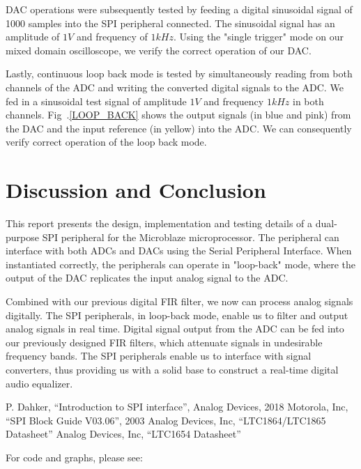 \documentclass[conference]{IEEEtran}
\begin{document}
DAC operations were subsequently tested by feeding a digital sinusoidal signal of 1000 samples into the SPI peripheral connected. The sinusoidal signal has an amplitude of $1V$ and frequency of $1kHz$. Using the "single trigger" mode on our mixed domain oscilloscope, we verify the correct operation of our DAC.

Lastly, continuous loop back mode is tested by simultaneously reading from both channels of the ADC and writing the converted digital signals to the ADC. We fed in a sinusoidal test signal of amplitude $1V$ and frequency $1kHz$ in both channels. Fig~.\ref{LOOP_BACK} shows the output signals (in blue and pink) from the DAC and the input reference (in yellow) into the ADC. We can consequently verify correct operation of the loop back mode.


\section{Discussion and Conclusion} \label{discussion}
This report presents the design, implementation and testing details of a dual-purpose SPI peripheral for the Microblaze\textregistered{} microprocessor. The peripheral can interface with both ADCs and DACs using the Serial Peripheral Interface. When instantiated correctly, the peripherals can operate in "loop-back" mode, where the output of the DAC replicates the input analog signal to the ADC. 

Combined with our previous digital FIR filter, we now can process analog signals digitally. The SPI peripherals, in loop-back mode, enable us to filter and output analog signals in real time. Digital signal output from the ADC can be fed into our previously designed FIR filters, which attenuate signals in undesirable frequency bands. The SPI peripherals enable us to interface with signal converters, thus providing us with a solid base to construct a real-time digital audio equalizer.

\begin{thebibliography}{00}
 P. Dahker, ``Introduction to SPI interface'', Analog Devices, 2018
 Motorola, Inc, ``SPI Block Guide V03.06'', 2003
 Analog Devices, Inc, ``LTC1864/LTC1865 Datasheet''
 Analog Devices, Inc, ``LTC1654 Datasheet''
\end{thebibliography}

\newpage
\onecolumn
For code and graphs, please see: 
\end{document}
